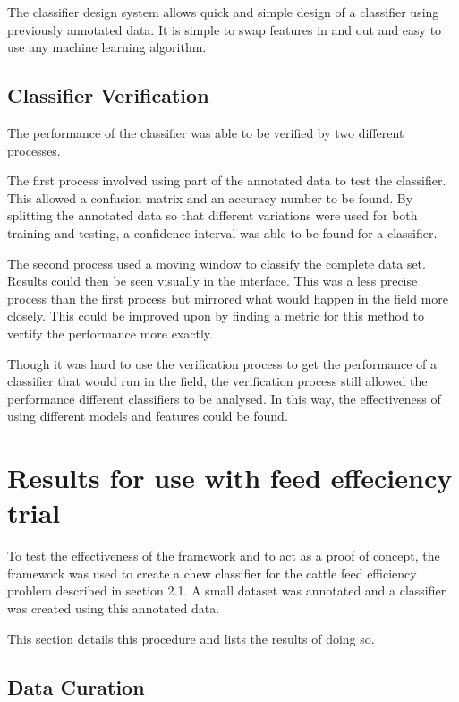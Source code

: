 The classifier design system allows quick and simple design of a classifier using previously annotated data. It is simple to swap features in and out and easy to use any machine learning algorithm. 

\subsection{Classifier Verification}

The performance of the classifier was able to be verified by two different processes. 

The first process involved using part of the annotated data to test the classifier. This allowed a confusion matrix and an accuracy number to be found. By splitting the annotated data so that different variations were used for both training and testing, a confidence interval was able to be found for a classifier. 

The second process used a moving window to classify the complete data set. Results could then be seen visually in the interface. This was a less precise process than the first process but mirrored what would happen in the field more closely. This could be improved upon by finding a metric for this method to vertify the performance more exactly. 

Though it was hard to use the verification process to get the performance of a classifier that would run in the field, the verification process still allowed the performance different classifiers to be analysed. In this way, the effectiveness of using different models and features could be found. 

\section{Results for use with feed effeciency trial}

To test the effectiveness of the framework and to act as a proof of concept, the framework was used to create a chew classifier for the cattle feed efficiency problem described in section 2.1. A small dataset was annotated and a classifier was created using this annotated data. 

This section details this procedure and lists the results of doing so. 

\subsection{Data Curation}


